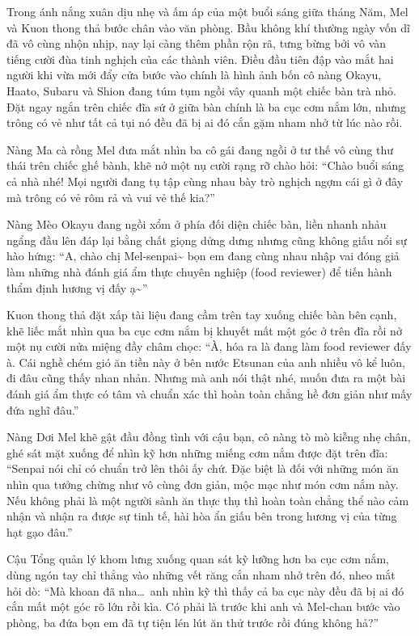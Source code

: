 \documentclass[../main.tex]{subfiles}
\begin{document}
Trong ánh nắng xuân dịu nhẹ và ấm áp của một buổi sáng giữa tháng Năm, Mel và Kuon thong thả bước chân vào văn phòng. Bầu không khí thường ngày vốn dĩ đã vô cùng nhộn nhịp, nay lại càng thêm phần rộn rã, tưng bừng bởi vô vàn tiếng cười đùa tinh nghịch của các thành viên. Điều đầu tiên đập vào mắt hai người khi vừa mới đẩy cửa bước vào chính là hình ảnh bốn cô nàng Okayu, Haato, Subaru và Shion đang túm tụm ngồi vây quanh một chiếc bàn trà nhỏ. Đặt ngay ngắn trên chiếc đĩa sứ ở giữa bàn chính là ba cục cơm nắm lớn, nhưng trông có vẻ như tất cả tụi nó đều đã bị ai đó cắn gặm nham nhở từ lúc nào rồi.


Nàng Ma cà rồng Mel đưa mắt nhìn ba cô gái đang ngồi ở tư thế vô cùng thư thái trên chiếc ghế bành, khẽ nở một nụ cười rạng rỡ chào hỏi: ``Chào buổi sáng cả nhà nhé! Mọi người đang tụ tập cùng nhau bày trò nghịch ngợm cái gì ở đây mà trông có vẻ rôm rả và vui vẻ thế kia?''

Nàng Mèo Okayu đang ngồi xổm ở phía đối diện chiếc bàn, liền nhanh nhảu ngẩng đầu lên đáp lại bằng chất giọng dửng dưng nhưng cũng không giấu nổi sự hào hứng: ``A, chào chị Mel-senpai\~{} bọn em đang cùng nhau nhập vai đóng giả làm những nhà đánh giá ẩm thực chuyên nghiệp (food reviewer) để tiến hành thẩm định hương vị đấy ạ\~{}''

Kuon thong thả đặt xấp tài liệu đang cầm trên tay xuống chiếc bàn bên cạnh, khẽ liếc mắt nhìn qua ba cục cơm nắm bị khuyết mất một góc ở trên đĩa rồi nở một nụ cười nửa miệng đầy châm chọc: ``À, hóa ra là đang làm food reviewer đấy à. Cái nghề chém gió ăn tiền này ở bên nước Etsunan của anh nhiều vô kể luôn, đi đâu cũng thấy nhan nhản. Nhưng mà anh nói thật nhé, muốn đưa ra một bài đánh giá ẩm thực có tâm và chuẩn xác thì hoàn toàn chẳng hề đơn giản như mấy đứa nghĩ đâu.''

Nàng Dơi Mel khẽ gật đầu đồng tình với cậu bạn, cô nàng tò mò kiễng nhẹ chân, ghé sát mặt xuống để nhìn kỹ hơn những miếng cơm nắm được đặt trên đĩa: ``Senpai nói chỉ có chuẩn trở lên thôi ấy chứ. Đặc biệt là đối với những món ăn nhìn qua tưởng chừng như vô cùng đơn giản, mộc mạc như món cơm nắm này. Nếu không phải là một người sành ăn thực thụ thì hoàn toàn chẳng thể nào cảm nhận và nhận ra được sự tinh tế, hài hòa ẩn giấu bên trong hương vị của từng hạt gạo đâu.''

Cậu Tổng quản lý khom lưng xuống quan sát kỹ lưỡng hơn ba cục cơm nắm, dùng ngón tay chỉ thẳng vào những vết răng cắn nham nhở trên đó, nheo mắt hỏi dò: ``Mà khoan đã nha\dots\ anh nhìn kỹ thì thấy cả ba cục này đều đã bị ai đó cắn mất một góc rõ lớn rồi kìa. Có phải là trước khi anh và Mel-chan bước vào phòng, ba đứa bọn em đã tự tiện lén lút ăn thử trước rồi đúng không hả?''
\end{document}
